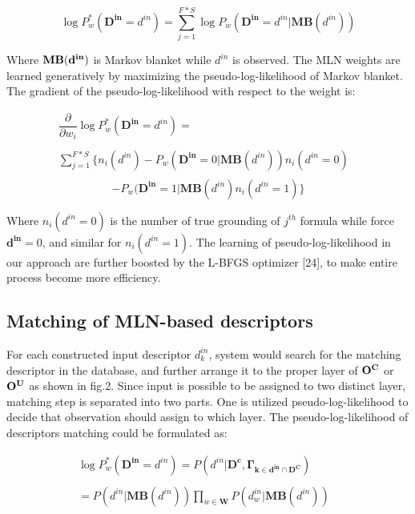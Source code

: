 \documentclass[journal]{IEEEtran}
\begin{document}
\begin{equation}
\log P^*_w(\mathbf{D^{in}} = d^{in}) = \sum_{j=1}^{F*S} \log P_{w}(\mathbf{D^{in}} = d^{in}|\mathbf{MB}(d^{in}))
\end{equation}

Where $\bf{MB}(d^{in})$ is Markov blanket while $d^{in}$ is observed. The MLN weights are learned generatively by maximizing the pseudo-log-likelihood of Markov blanket. The gradient of the pseudo-log-likelihood with respect to the weight is:

\begin{displaymath}
\begin{array}{ll}
\dfrac{\partial}{\partial w_i}\log P^*_w(\mathbf{D^{in}} = d^{in})= &\\\\
\sum^{F*S}_{j=1}\{n_i(d^{in})-P_w(\mathbf{D^{in}}=0|\mathbf{MB}(d^{in}))n_i(d^{in}=0) &\\
\end{array}
\end{displaymath}
\begin{equation}
-P_w(\mathbf{D^{in}}=1|\mathbf{MB}(d^{in})n_i(d^{in}=1)\}
\end{equation}

Where $n_i(d^{in}=0)$ is the number of true grounding of $j^{th}$ formula while force $\mathbf{d^{in}}=0$, and similar for $n_i(d^{in}=1)$. The learning of pseudo-log-likelihood in our approach are further boosted by the L-BFGS optimizer [24], to make entire process become more efficiency.



\subsection{Matching of MLN-based descriptors}
For each constructed input descriptor $d^{in}_k$, system would search for the matching descriptor in the database, and further arrange it to the proper layer of $\bf{O^C}$ or $\bf{O^U}$ as shown in fig.2. Since input is possible to be assigned to two distinct layer, matching step is separated into two parts. One is utilized pseudo-log-likelihood to decide that observation should assign to which layer. The pseudo-log-likelihood of descriptors matching could be formulated as:


\begin{equation}
\begin{array}{ll}

\log P^*_w(\mathbf{D^{in}} = d^{in}) =P( d^{in}|\mathbf{ D^c , \Gamma_{k \in {d^{in}} \cap D^C}}) &\\\\
= P(d^{in} | \mathbf{MB}(d^{in})) \prod_{w\in{\mathbf W}}{P(d^{in}_w | \mathbf{MB}(d^{in}))}
\end{array}
\end{equation}
\end{document}
